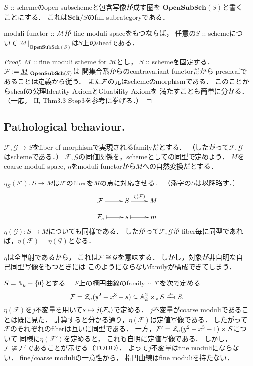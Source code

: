 \documentclass[a4paper]{jsarticle}
\newcommand{\Sch}{\mathbf{Sch}}
\newcommand{\OpenSubSch}{\mathbf{OpenSubSch}}
\newcommand{\famF}{\mathcal{F}}
\newcommand{\famG}{\mathcal{G}}
\newcommand{\func}[1]{\underline{#1}}
\newcommand{\ftorM}{\mathcal{M}}
\begin{document}
    \begin{Prop}
        $S$ :: schemeのopen subschemeと包含写像が成す圏を
        $\OpenSubSch(S)$と書くことにする．
        これは$\Sch/S$のfull subcategoryである．

        moduli functor :: $\ftorM$が
        fine moduli spaceをもつならば，
        任意の$S$ :: schemeについて
        $\ftorM|_{\OpenSubSch(S)}$は$S$上のsheafである．
    \end{Prop}
    \begin{proof}
        $M$ :: fine moduli scheme for $\ftorM$とし，
        $S$ :: schemeを固定する．
        $\shF:=\func{M}|_{\OpenSubSch(S)}$は
        開集合系からのcontravariant functorだから
        presheafであることは定義から従う．
        また$\mathcal{F}$の元はschemeのmorphismである．
        このことからsheafの公理Identity AxiomとGluability Axiomを
        満たすことも簡単に分かる．
        （一応，\cite{HarAG} II, Thm3.3 Step3を参考に挙げる．）
    \end{proof}

    \subsection{Pathological behaviour.}
    $\famF, \famG \to S$をfiber of morphismで実現されるfamilyだとする．
    （したがって$\famF, \famG$はschemeである．）
    $\famF, \famG$の同値関係を，schemeとしての同型で定めよう．
    $M$をcoarse moduli space, 
    $\eta$をmoduli functorから$\func{M}$への自然変換だとする．

    $\eta_S(\famF): S \to M$は$\famF$のfiberを$M$の点に対応させる．
    （添字の$S$は以降略す．）
    \[
    \xymatrix@R=10pt
    {
        \famF \ar[r]& S \ar[r]^-{\eta(\famF)}& M \\
        \famF_s \ar@{{|}->}[r]& s \ar@{{|}->}[r]& m
    }
    \]
    $\eta(\famG): S \to M$についても同様である．
    したがって$\famF, \famG$が
    fiber毎に同型であれば，$\eta(\famF)=\eta(\famG)$となる．

    $\eta$は全単射であるから，
    これは$\famF \iso \famG$を意味する．
    しかし，対象が非自明な自己同型写像をもつときには
    このようにならないfamilyが構成できてしまう．

    \begin{Example}
        $S=\mathbb{A}^1_k-\{0\}$とする．
        $S$上の楕円曲線のfamily :: $\famF$を次で定める．
        \[
            \famF=\zerosa(y^2-x^3-s) \subseteq \affine^2_k \times_k S
            \xrightarrow{\pr} S.
        \]
        $\eta(\famF)$を$j$不変量を用いて$s \mapsto j(\mathcal{F}_s)$で定める．
        $j$不変量がcoarse moduliであることは既に見た．
        計算すると分かる通り，$\eta(\famF)$は定値写像である．
        したがって$\famF$のそれぞれのfiberは互いに同型である．
        一方，$\famF'=\zerosa(y^2-x^3-1) \times S$について
        同様に$\eta(\famF')$を定めると，
        これも自明に定値写像である．
        しかし，$\famF \not \iso \famF'$であることが示せる（TODO）．
        よって$j$不変量はfine moduliにならない．
        fine/coarse moduliの一意性から，
        楕円曲線はfine moduliを持たない．
    \end{Example}
\end{document}
